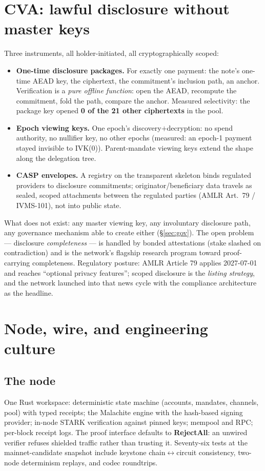 \documentclass[11pt]{article}
\begin{document}
\section{CVA: lawful disclosure without master keys}\label{sec:cva}
Three instruments, all holder-initiated, all cryptographically scoped:
\begin{itemize}[leftmargin=1.4em,itemsep=2pt]
  \item \textbf{One-time disclosure packages.} For exactly one payment: the note's one-time AEAD key, the ciphertext, the commitment's inclusion path, an anchor. Verification is a \emph{pure offline function}: open the AEAD, recompute the commitment, fold the path, compare the anchor. Measured selectivity: the package key opened \textbf{0 of the 21 other ciphertexts} in the pool.
  \item \textbf{Epoch viewing keys.} One epoch's discovery$+$decryption: no spend authority, no nullifier key, no other epochs (measured: an epoch-1 payment stayed invisible to IVK(0)). Parent-mandate viewing keys extend the shape along the delegation tree.
  \item \textbf{CASP envelopes.} A registry on the transparent skeleton binds regulated providers to disclosure commitments; originator/beneficiary data travels as sealed, scoped attachments between the regulated parties (AMLR Art.~79 / IVMS-101), not into public state.
\end{itemize}
What does not exist: any master viewing key, any involuntary disclosure path, any governance mechanism able to create either (\S\ref{sec:gov}). The open problem --- disclosure \emph{completeness} --- is handled by bonded attestations (stake slashed on contradiction) and is the network's flagship research program toward proof-carrying completeness. Regulatory posture: AMLR Article 79 applies 2027-07-01 and reaches ``optional privacy features''; scoped disclosure is the \emph{listing strategy}, and the network launched into that news cycle with the compliance architecture as the headline.

\section{Node, wire, and engineering culture}\label{sec:eng}
\subsection{The node}
One Rust workspace: deterministic state machine (accounts, mandates, channels, pool) with typed receipts; the Malachite engine with the hash-based signing provider; in-node STARK verification against pinned keys; mempool and RPC; per-block receipt logs. The proof interface defaults to \textbf{RejectAll}: an unwired verifier refuses shielded traffic rather than trusting it. Seventy-six tests at the mainnet-candidate snapshot include keystone chain$\leftrightarrow$circuit consistency, two-node determinism replays, and codec roundtrips.
\end{document}
